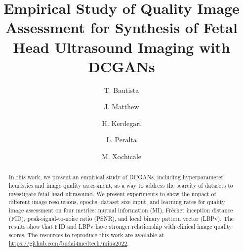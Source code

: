 \documentclass[runningheads]{llncs}
\begin{document}
\title{Empirical Study of Quality Image Assessment for Synthesis of Fetal Head Ultrasound Imaging with DCGANs}

\author{
T. Bautista \and %
J. Matthew \and %
H. Kerdegari \and %
L. Peralta \and %
M. Xochicale %
}

%
\maketitle              %

\begin{abstract}
In this work, we present an empirical study of DCGANs, including hyperparameter heuristics and image quality assessment, as a way to address the scarcity of datasets to investigate fetal head ultrasound.
We present experiments to show the impact of different image resolutions, epochs, dataset size input, and learning rates for quality image assessment on four metrics: mutual information (MI), Fr\'echet inception distance (FID), peak-signal-to-noise ratio (PSNR), and local binary pattern vector (LBPv). 
The results show that FID and LBPv have stronger relationship with clinical image quality scores.
The resources to reproduce this work are available at %
\url{https://github.com/budai4medtech/miua2022}.
\end{abstract}
\end{document}
